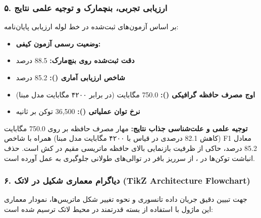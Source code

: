 \subsubsection*{۵. ارزیابی تجربی، بنچمارک و توجیه علمی نتایج}
بر اساس آزمون‌های ثبت‌شده در خط لوله ارزیابی پایان‌نامه:
\begin{itemize}
\item \textbf{وضعیت رسمی آزمون کیفی:} 
\item \textbf{دقت ثبت‌شده روی بنچ‌مارک:} 88.5 درصد
\item \textbf{شاخص ارزیابی آماری ():} 85.2 درصد
\item \textbf{اوج مصرف حافظه گرافیکی ():} 750.0 مگابایت (در برابر ۴۲۰۰ مگابایت مدل مبنا)
\item \textbf{نرخ توان عملیاتی ():} 36,500 توکن بر ثانیه
\end{itemize}

\textbf{توجیه علمی و علت‌شناسی جذاب نتایج:}
مهار مصرف حافظه بر روی 750.0 مگابایت (کاهش 82.1 درصدی در قیاس با ۴۲۰۰ مگابایت مدل مبنا) همراه با شاخص F1 معادل 85.2 درصد، حاکی از ظرفیت بازنمایی بالای حافظه ماتریسی مقیم در کش  است. حذف انباشت توکن‌ها در ، از سرریز بافر در توالی‌های طولانی جلوگیری به عمل آورده است.



\subsubsection*{۶. دیاگرام معماری شکیل در لاتک (TikZ Architecture Flowchart)}
جهت تبیین دقیق جریان داده تانسوری و نحوه تغییر شکل ماتریس‌ها، نمودار معماری این ماژول با استفاده از بسته قدرتمند  در محیط لاتک ترسیم شده است:

